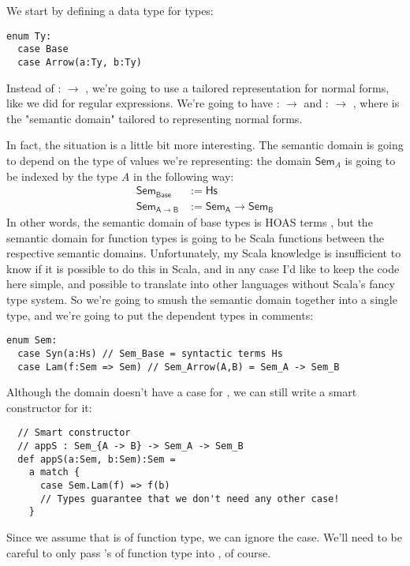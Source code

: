 We start by defining a data type for types:

\begin{lstlisting}
enum Ty:
  case Base
  case Arrow(a:Ty, b:Ty)
\end{lstlisting}

Instead of  :  $\to$ , we're going to use a tailored representation for normal forms, like we did for regular expressions.
We're going to have  :  $\to$  and  :  $\to$ , where  is the "semantic domain" tailored to representing normal forms.

In fact, the situation is a little bit more interesting.
The semantic domain is going to depend on the type of values we're representing: the domain $\mathsf{Sem}_A$ is going to be indexed by the type $A$ in the following way:
\begin{align*}
  \mathsf{Sem}_\mathsf{Base} &:= \mathsf{Hs} \\
  \mathsf{Sem}_{\mathsf{A} \to \mathsf{B}} &:= \mathsf{Sem}_\mathsf{A} \to \mathsf{Sem}_\mathsf{B}
\end{align*}
In other words, the semantic domain of base types is HOAS terms , but the semantic domain for function types is going to be Scala functions between the respective semantic domains.
Unfortunately, my Scala knowledge is insufficient to know if it is possible to do this in Scala, and in any case I'd like to keep the code here simple, and possible to translate into other languages without Scala's fancy type system.
So we're going to smush the semantic domain together into a single type, and we're going to put the dependent types in comments:
\begin{lstlisting}
enum Sem:
  case Syn(a:Hs) // Sem_Base = syntactic terms Hs
  case Lam(f:Sem => Sem) // Sem_Arrow(A,B) = Sem_A -> Sem_B
\end{lstlisting}

Although the  domain doesn't have a case for , we can still write a smart constructor for it:

\begin{lstlisting}
  // Smart constructor
  // appS : Sem_{A -> B} -> Sem_A -> Sem_B
  def appS(a:Sem, b:Sem):Sem =
    a match {
      case Sem.Lam(f) => f(b)
      // Types guarantee that we don't need any other case!
    }
\end{lstlisting}

Since we assume that  is of function type, we can ignore the  case.
We'll need to be careful to only pass 's of function type into , of course.

